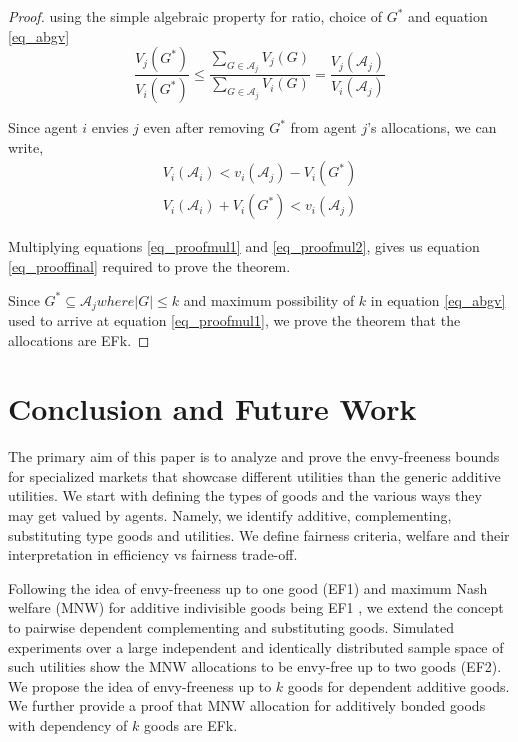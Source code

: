 \begin{proof}
using the simple algebraic property for ratio, choice of $G^*$ and equation \ref{eq_abgv}
\begin{equation}
\label{eq_proofmul1}
    \frac{V_j(G^*)}{V_i(G^*)} \leq \frac{\sum_{G \in \mathcal{A}_j}V_j(G)}{\sum_{G \in \mathcal{A}_j}V_i(G)} = \frac{V_j(\mathcal{A}_j)}{V_i(\mathcal{A}_j)}
\end{equation}

Since agent $i$ envies $j$ even after removing $G^*$ from agent $j$'s allocations, we can write,
\begin{equation}
\label{eq_proofmul2}
\begin{gathered}
    V_i(\mathcal{A}_i) < v_i(\mathcal{A}_j) - V_i(G^*) \\
    V_i(\mathcal{A}_i) + V_i(G^*) < v_i(\mathcal{A}_j)
\end{gathered}
\end{equation}

Multiplying equations \ref{eq_proofmul1} and \ref{eq_proofmul2}, gives us equation \ref{eq_prooffinal} required to prove the theorem.

Since $G^* \subseteq \mathcal{A}_j where |G| \leq k$ and maximum possibility of $k$ in equation \ref{eq_abgv} used to arrive at equation \ref{eq_proofmul1}, we prove the theorem that the allocations are EFk.

\end{proof}


\section{Conclusion and Future Work}
\label{section_conclusion}

The primary aim of this paper is to analyze and prove the envy-freeness bounds for specialized markets that showcase different utilities than the generic additive utilities. We start with defining the types of goods and the various ways they may get valued by agents. Namely, we identify additive, complementing, substituting type goods and utilities. We define fairness criteria, welfare and their interpretation in efficiency vs fairness trade-off. 

Following the idea of envy-freeness up to one good (EF1) and maximum Nash welfare (MNW) for additive indivisible goods being EF1 \cite{caragiannis2016unreasonable}, we extend the concept to pairwise dependent complementing and substituting goods. Simulated experiments over a large independent and identically distributed sample space of such utilities show the MNW allocations to be envy-free up to two goods (EF2). We propose the idea of envy-freeness up to $k$ goods for dependent additive goods. We further provide a proof that MNW allocation for additively bonded goods with depend\-ency of $k$ goods are EFk.

